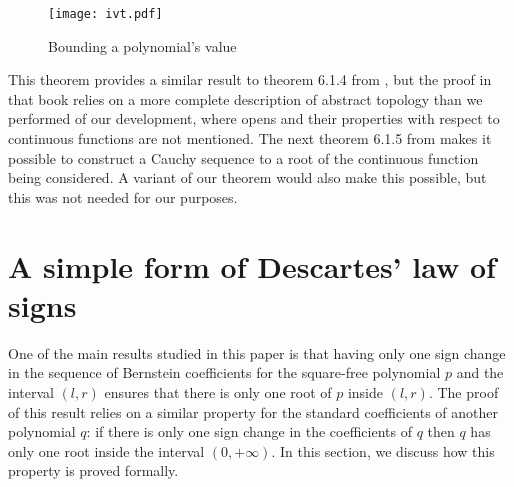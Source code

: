 \documentclass{mscs}
\begin{document}
\begin{figure}[h]
\begin{center}
\texttt{[image: ivt.pdf]}
\caption{\label{ivt} Bounding a polynomial's value}
\end{center}
\end{figure}
This theorem provides a similar result to theorem 6.1.4 from
\cite{TroelstraVDalen1}, but the proof in that book relies on a more complete
description of abstract topology than we performed of our development,
where opens and their properties with respect to continuous functions
are not mentioned.  The next theorem 6.1.5 from \cite{TroelstraVDalen1} makes it
possible to construct a Cauchy sequence to a root of the continuous
function being considered.  A variant of our theorem would also make
this possible, but this was not needed for our purposes.

\section{A simple form of Descartes' law of signs}\label{sec:descartes}
One of the main results studied in this paper
is that having only one sign change in the
sequence of Bernstein coefficients for the square-free polynomial \(p\) and the
interval \((l,r)\) ensures that there is only one root of \(p\) inside
\((l,r)\).  The proof of this result relies on a similar property for
the standard coefficients of another polynomial \(q\): if there is
only one sign change in the coefficients of \(q\) then \(q\) has
only one root inside the interval \((0,+\infty)\).  In this section, we
discuss how this property is proved formally.
\end{document}
